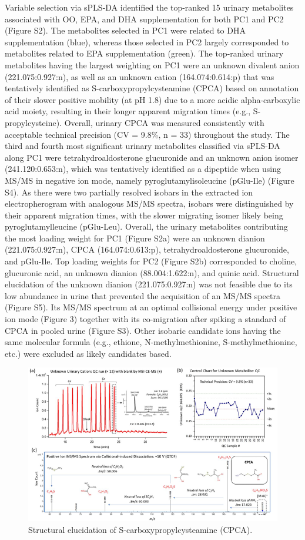 \documentclass[journal=jacsat,manuscript=article]{achemso}
\begin{document}
Variable selection via sPLS-DA identified the top-ranked 15 urinary
metabolites associated with OO, EPA, and DHA supplementation for both
PC1 and PC2 (Figure S2). The metabolites selected in PC1 were related to
DHA supplementation (blue), whereas those selected in PC2 largely
corresponded to metabolites related to EPA supplementation (green). The
top-ranked urinary metabolites having the largest weighting on PC1 were
an unknown divalent anion (221.075:0.927:n), as well as an unknown
cation (164.074:0.614:p) that was tentatively identified as
S-carboxypropylcysteamine (CPCA) based on annotation of their slower
positive mobility (at pH 1.8) due to a more acidic alpha-carboxylic acid
moiety, resulting in their longer apparent migration times (e.g.,
S-propylcysteine). Overall, urinary CPCA was measured consistently with
acceptable technical precision (CV = 9.8\%, n = 33) throughout the
study. The third and fourth most significant urinary metabolites
classified via sPLS-DA along PC1 were tetrahydroaldosterone glucuronide
and an unknown anion isomer (241.120:0.653:n), which was tentatively
identified as a dipeptide when using MS/MS in negative ion mode, namely
pyroglutamylisoleucine (pGlu-Ile) (Figure S4). As there were two
partially resolved isobars in the extracted ion electropherogram with
analogous MS/MS spectra, isobars were distinguished by their apparent
migration times, with the slower migrating isomer likely being
pyroglutamylleucine (pGlu-Leu). Overall, the urinary metabolites
contributing the most loading weight for PC1 (Figure S2a) were an
unknown dianion (221.075:0.927:n), CPCA (164.074:0.613:p),
tetrahydroaldosterone glucuronide, and pGlu-Ile. Top loading weights for
PC2 (Figure S2b) corresponded to choline, glucuronic acid, an unknown
dianion (88.004:1.622:n), and quinic acid. Structural elucidation of the
unknown dianion (221.075:0.927:n) was not feasible due to its low
abundance in urine that prevented the acquisition of an MS/MS spectra
(Figure S5). Its MS/MS spectrum at an optimal collisional energy under
positive ion mode (Figure 3) together with its co-migration after
spiking a standard of CPCA in pooled urine (Figure S3). Other isobaric
candidate ions having the same molecular formula (e.g., ethione,
N-methylmethionine, S-methylmethionine, etc.) were excluded as likely
candidates based.

\begin{figure}
\includegraphics[width=0.8\linewidth]{../Figures/Chromatograms} \caption{Structural elucidation of S-carboxypropylcysteamine (CPCA).}\label{fig:unnamed-chunk-3}
\end{figure}
\end{document}
